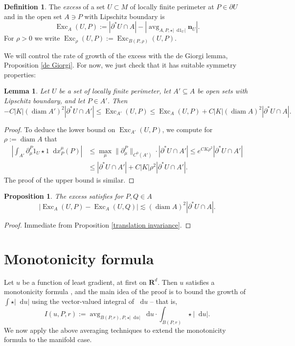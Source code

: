 \documentclass[final,12pt, leqno]{brownthesis}
\newcommand{\RR}{\mathbf{R}}
\DeclareMathOperator{\avg}{avg}
\DeclareMathOperator{\diam}{diam}
\DeclareMathOperator{\Exc}{Exc}
\newcommand*\dif{\mathop{}\!\mathrm{d}}
\newcommand{\normal}{\mathbf n}
\newcommand{\dfn}[1]{\emph{#1}\index{#1}}
\newtheorem{lemma}[theorem]{Lemma}
\newtheorem{proposition}[theorem]{Proposition}
\theoremstyle{definition}
\newtheorem{definition}[theorem]{Definition}
\numberwithin{equation}{section}
\begin{document}
\begin{definition}
The \dfn{excess} of a set $U \subset M$ of locally finite perimeter at $P \in \partial U$ and in the open set $A \ni P$ with Lipschitz boundary is
$$\Exc_A(U, P) := |\partial^* U \cap A| - \left|\avg_{A, P, \star |\dif 1_U|} \normal_U\right|.$$
For $\rho > 0$ we write $\Exc_\rho(U, P) := \Exc_{B(P, \rho)}(U, P)$.
\end{definition}

We will control the rate of growth of the excess with the de Giorgi lemma, Proposition \ref{de Giorgi}.
For now, we just check that it has suitable symmetry properties:

\begin{lemma}
Let $U$ be a set of locally finite perimeter, let $A' \subseteq A$ be open sets with Lipschitz boundary, and let $P \in A'$. Then
\begin{equation}\label{approximate monotone}
-C |K| (\diam A')^2 |\partial^* U \cap A'| \leq \Exc_{A'}(U, P) \leq \Exc_A(U, P) + C |K|(\diam A)^2 |\partial^* U \cap A|.
\end{equation}
\end{lemma}
\begin{proof}
To deduce the lower bound on $\Exc_{A'}(U, P)$, we compute for $\rho := \diam A$ that
\begin{align*}
    \left|\int_{A'} \partial^P_\mu 1_U \star 1 \dif x_P^\mu(P)\right|
 & \leq \max_\mu \|\partial^P_\mu\|_{C^0(A')} \cdot |\partial^* U \cap A'| \leq e^{CK\rho^2} |\partial^* U \cap A'| \\
 & \leq |\partial^* U \cap A'| + C|K|\rho^2 |\partial^* U \cap A'|.
\end{align*}
The proof of the upper bound is similar.
\end{proof}

\begin{proposition}\label{translation invariance excess}
The excess satisfies for $P, Q \in A$
$$|\Exc_A(U, P) - \Exc_A(U, Q)| \lesssim (\diam A)^2 |\partial^* U \cap A|.$$
\end{proposition}
\begin{proof}
Immediate from Proposition \ref{translation invariance}.
\end{proof}


\section{Monotonicity formula}\label{MollifierSection}
Let $u$ be a function of least gradient, at first on $\RR^d$.
Then $u$ satisfies a monotonicity formula \cite[Theorem 5.12]{Giusti77}, and the main idea of the proof is to bound the growth of $\int \star |\dif u|$ using the vector-valued integral of $\dif u$ -- that is,
\begin{equation}\label{integral of du}
I(u, P, r) := \avg_{B(P, r), P, \star |\dif u|} \dif u \cdot \int_{B(P, r)} \star |\dif u|.
\end{equation}
We now apply the above averaging techniques to extend the monotonicity formula to the manifold case.
\end{document}
